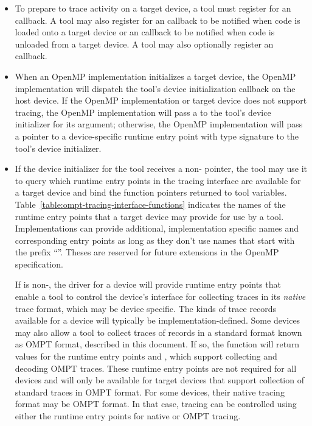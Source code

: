 \begin{itemize}
\item To prepare to trace activity on a target device, a tool must register for an
   callback.  A tool may also register for an
   callback to be notified when code is loaded onto a target device or
an  callback to be notified when code is unloaded from a target device.
A tool may also optionally register an  callback.
\item When an OpenMP implementation initializes a target device, the
  OpenMP implementation will dispatch the tool's device initialization
  callback on the host device. If the OpenMP implementation or target device does not support tracing,
  the OpenMP implementation will pass a  to the tool's device initializer for its
   argument; otherwise, the OpenMP implementation will pass
  a pointer to a device-specific runtime entry point with type
  signature  to the tool's device initializer.
\item If the device initializer for the tool receives a
  non-  pointer, the tool may use it to query
  which runtime entry points in the tracing interface are available for a target device
  and bind the function pointers returned to tool variables.
  Table~\ref{table:ompt-tracing-interface-functions} indicates the
  names of the runtime entry points that a target device may provide for use
  by a tool.
  Implementations
can provide additional, implementation specific names and corresponding
entry points as long as they don't use names that start with the prefix
``''. Theses are reserved for future extensions in the
OpenMP specification.

  If  is non-, the driver for a device will
  provide runtime entry points that enable a tool to control the device's
  interface for collecting traces in its \emph{native} trace format,
  which may be device specific.
  The kinds of trace records available for a device will typically be
  implementation-defined.
  Some devices may also allow a tool to
  collect traces of records in a standard format known as OMPT format,
  described in this document. If so, the  function will
  return values for the runtime entry points
   and , which support
  collecting and decoding OMPT traces.
  These runtime entry points are not required for all devices and will only be available for target devices that support
  collection of standard traces in OMPT format.
  For some devices, their native
  tracing format may be OMPT format. In that case, tracing can be
  controlled using either the runtime entry points for native or OMPT
  tracing.


\end{itemize}
